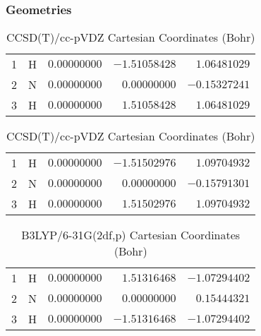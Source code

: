 \documentclass[10pt,oneside]{article}
\begin{document}
\begin{table}[h!]
\subsubsection*{Geometries}
\begin{multicols}{2}
\centering
\caption{CCSD(T)/cc-pVTZ Cartesian Coordinates (Bohr)}
\begin{tabular}{llrrr}
\toprule
1  & H  & $ 0.00000000$ & $-1.51058428$ & $ 1.06481029$ \\
2  & N  & $ 0.00000000$ & $ 0.00000000$ & $-0.15327241$ \\
3  & H  & $ 0.00000000$ & $ 1.51058428$ & $ 1.06481029$ \\
\bottomrule
\end{tabular}
\caption{CCSD(T)/cc-pVDZ Cartesian Coordinates (Bohr)}
\begin{tabular}{llrrr}
\toprule
1  & H  & $ 0.00000000$ & $-1.51502976$ & $ 1.09704932$ \\
2  & N  & $ 0.00000000$ & $ 0.00000000$ & $-0.15791301$ \\
3  & H  & $ 0.00000000$ & $ 1.51502976$ & $ 1.09704932$ \\
\bottomrule
\end{tabular}
\end{multicols}
\end{table}

\begin{table}[h]
\centering
\caption{B3LYP/6-31G(2df,p) Cartesian Coordinates (Bohr)}
\begin{tabular}{llrrr}
\toprule
1  & H  & $ 0.00000000$ & $ 1.51316468$ & $-1.07294402$ \\
2  & N  & $ 0.00000000$ & $ 0.00000000$ & $ 0.15444321$ \\
3  & H  & $ 0.00000000$ & $-1.51316468$ & $-1.07294402$ \\
\bottomrule
\end{tabular}
\end{table}
\end{document}
